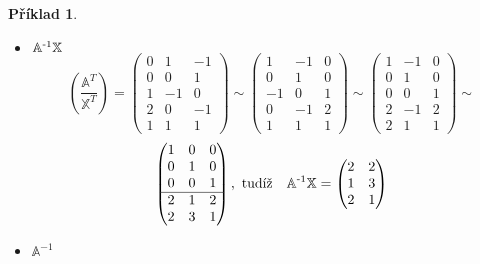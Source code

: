 \documentclass[12pt]{article}
\newtheorem{expl}[theorem]{Příklad}
\begin{document}
\begin{expl}
\begin{itemize}
\[\begin{pmatrix}
3 & 2 & 0 \\
-1& 0 & 0 \\
\end{pmatrix}
\]
\item $\mathbb{A}^{\text{\normalfont{-1}}}\mathbb{X}$
$$\left(\frac{\mathbb{A^{\textit{T}}}}{\mathbb{X^{\textit{T}}}}\right)
=
\begin{pmatrix}
0 & 1 & -1 \\
0 & 0 & 1 \\
1 & -1 & 0 \\ \hline
2 & 0 & -1 \\
1 & 1 & 1
\end{pmatrix}
\sim
\begin{pmatrix}
1 & -1 & 0 \\
0 & 1 & 0 \\
-1 & 0 & 1 \\ \hline
0 & -1 & 2 \\
1 & 1 & 1
\end{pmatrix}
\sim \begin{pmatrix}
1 & -1 & 0 \\
0 & 1 & 0 \\
0 & 0 & 1 \\ \hline
2 & -1 & 2 \\
2 & 1 & 1
\end{pmatrix}
\sim
$$
$$
\begin{pmatrix}
1 & 0 & 0 \\
0 & 1 & 0 \\
0 & 0 & 1 \\ \hline
2 & 1 & 2 \\
2 & 3 & 1  
\end{pmatrix},\text{ tudíž} \quad \mathbb{A}^{\text{\normalfont{-1}}}\mathbb{X} = 
\begin{pmatrix}
2 & 2 \\
1 & 3 \\
2 & 1 
\end{pmatrix}
$$
\item $\mathbb{A}^{-1}$


\end{itemize}
\end{expl}
\end{document}
